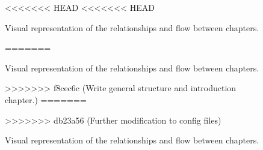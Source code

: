 \begin{figure}[!htbp]
    \newcommand{\imagenode}[3]{ %
            \node (#1) at #2 [label=above:\raisebox{-3em}{{\parbox{4em}{\centering \tiny #3}}}] {\texttt{[image: chapters/\#1/logo/main.pdf]}};
    }
    \begin{center}
    \end{center}
<<<<<<< HEAD
<<<<<<< HEAD
    \caption{Visual representation of the relationships and flow between chapters.}\label{fig:structure}
=======
    \caption{Visual representation of the relationships and flow between chapters.}
    \label{fig:structure}
>>>>>>> f8cec6c (Write general structure and introduction chapter.)
=======
    \caption{Visual representation of the relationships and flow between chapters.}\label{fig:structure}
>>>>>>> db23a56 (Further modification to config files)
\end{figure}
